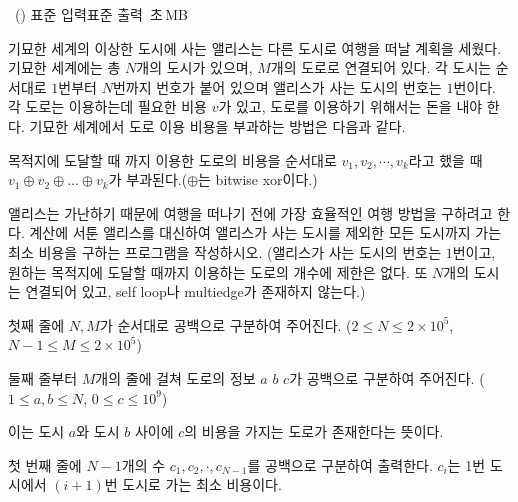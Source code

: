 \begin{problem}{\kcpcprobtrip\ (\kcpcprobtripshort)}
    {표준 입력}{표준 출력}
    {\kcpcprobtriptime\,초}{\kcpcprobtripmemory\,MB}{}
    
    기묘한 세계의 이상한 도시에 사는 앨리스는 다른 도시로 여행을 떠날 계획을 세웠다. 기묘한 세계에는 총 $N$개의 도시가 있으며, $M$개의 도로로 연결되어 있다. 각 도시는 순서대로 $1$번부터 $N$번까지 번호가 붙어 있으며 앨리스가 사는 도시의 번호는 $1$번이다. 각 도로는 이용하는데 필요한 비용 $v$가 있고, 도로를 이용하기 위해서는 돈을 내야 한다. 기묘한 세계에서 도로 이용 비용을 부과하는 방법은 다음과 같다.
    
    목적지에 도달할 때 까지 이용한 도로의 비용을 순서대로 $v_{1}, v_{2}, \cdots, v_{k}$라고 했을 때 $v_{1} \oplus v_{2} \oplus … \oplus v_{k}$가 부과된다.($\oplus$는 bitwise xor이다.)
    
    앨리스는 가난하기 때문에 여행을 떠나기 전에 가장 효율적인 여행 방법을 구하려고 한다. 계산에 서툰 앨리스를 대신하여 앨리스가 사는 도시를 제외한 모든 도시까지 가는 최소 비용을 구하는 프로그램을 작성하시오. (앨리스가 사는 도시의 번호는 $1$번이고, 원하는 목적지에 도달할 때까지 이용하는 도로의 개수에 제한은 없다. 또 $N$개의 도시는 연결되어 있고, self loop나 multiedge가 존재하지 않는다.)
    
    
    \InputFile
    첫째 줄에 $N, M$가 순서대로 공백으로 구분하여 주어진다. ($2 \le N \le 2 \times 10^5$, $N-1 \le M \le 2 \times 10^5$)
    
    둘째 줄부터 $M$개의 줄에 걸쳐 도로의 정보 $a$ $b$ $c$가 공백으로 구분하여 주어진다. ($1 \le a, b \le N$, $0 \le c \le 10^9$)
    
    이는 도시 $a$와 도시 $b$ 사이에 $c$의 비용을 가지는 도로가 존재한다는 뜻이다.
    
    
    \OutputFile
    첫 번째 줄에 $N-1$개의 수 $c_1, c_2, \cdot, c_{N-1}$를 공백으로 구분하여 출력한다. $c_i$는 1번 도시에서  $(i+1)$번 도시로 가는 최소 비용이다.
    
    \Examples
    \begin{example}
    \end{example}
    
\end{problem}


